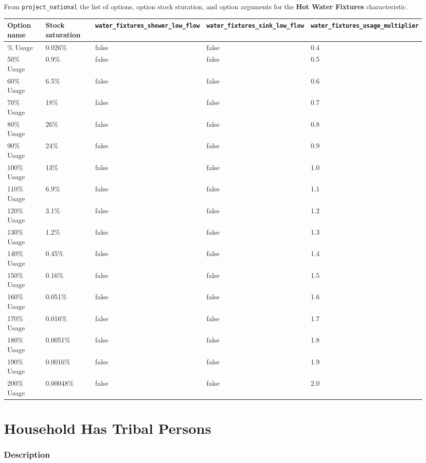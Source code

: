 From \texttt{project\_national} the list of options, option stock
sturation, and option arguments for the \textbf{Hot Water Fixtures}
characteristic.

\begin{longtable}[]{@{}lllll@{}}
\toprule\noalign{}
Option name & Stock saturation &
\texttt{water\_fixtures\_shower\_low\_flow} &
\texttt{water\_fixtures\_sink\_low\_flow} &
\texttt{water\_fixtures\_usage\_multiplier} \\
\midrule\noalign{}
\endhead
\bottomrule\noalign{}
\endlastfoot
40\% Usage & 0.026\% & false & false & 0.4 \\
50\% Usage & 0.9\% & false & false & 0.5 \\
60\% Usage & 6.5\% & false & false & 0.6 \\
70\% Usage & 18\% & false & false & 0.7 \\
80\% Usage & 26\% & false & false & 0.8 \\
90\% Usage & 24\% & false & false & 0.9 \\
100\% Usage & 13\% & false & false & 1.0 \\
110\% Usage & 6.9\% & false & false & 1.1 \\
120\% Usage & 3.1\% & false & false & 1.2 \\
130\% Usage & 1.2\% & false & false & 1.3 \\
140\% Usage & 0.45\% & false & false & 1.4 \\
150\% Usage & 0.16\% & false & false & 1.5 \\
160\% Usage & 0.051\% & false & false & 1.6 \\
170\% Usage & 0.016\% & false & false & 1.7 \\
180\% Usage & 0.0051\% & false & false & 1.8 \\
190\% Usage & 0.0016\% & false & false & 1.9 \\
200\% Usage & 0.00048\% & false & false & 2.0 \\
\end{longtable}

\section{Household Has Tribal
Persons}\label{household_has_tribal_persons}

\subsubsection{Description}\label{description-94}

